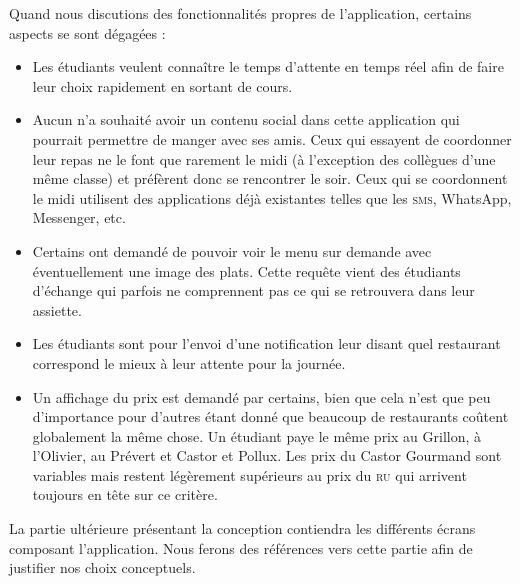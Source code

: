 Quand nous discutions des fonctionnalités propres de l'application, certains
aspects se sont dégagées : 
\begin{itemize}
\item Les étudiants veulent connaître le temps d'attente en temps réel afin de
faire leur choix rapidement en sortant de cours. 
\item Aucun n'a souhaité avoir un contenu social dans cette application qui 
pourrait permettre de manger avec ses amis. Ceux qui essayent de coordonner leur
repas ne le font que rarement le midi (à l'exception des collègues d'une 
même classe) et préfèrent donc se rencontrer le soir. Ceux qui se coordonnent
le midi utilisent des applications déjà existantes telles que les \textsc{sms},
WhatsApp, Messenger, etc.
\item Certains ont demandé de pouvoir voir le menu sur demande avec
éventuellement une image des plats. Cette requête vient des étudiants d'échange
qui parfois ne comprennent pas ce qui se retrouvera dans leur assiette.
\item Les étudiants sont pour l'envoi d'une notification leur disant quel
restaurant correspond le mieux à leur attente pour la journée. 
\item Un affichage du prix est demandé par certains, bien que cela n'est que
peu d'importance pour d'autres étant donné que beaucoup de restaurants coûtent
globalement la même chose. Un étudiant paye le même prix au Grillon, à l'Olivier,
au Prévert et Castor et Pollux. Les prix du Castor Gourmand sont variables mais
restent légèrement supérieurs au prix du \textsc{ru} qui arrivent toujours en tête sur
ce critère.
\end{itemize}

La partie ultérieure présentant la conception contiendra les différents écrans
composant l'application. Nous ferons des références vers cette partie afin
de justifier nos choix conceptuels.
